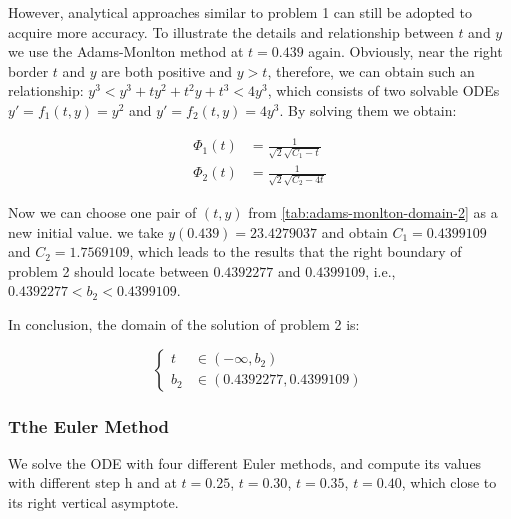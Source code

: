 \documentclass[a4paper]{article}
\begin{document}
	However, analytical approaches similar to problem 1 can still be adopted to acquire more accuracy. To illustrate the details and relationship between $t$ and $y$ we use the Adams-Monlton method at $t = 0.439$ again. Obviously, near the right border $t$ and $y$ are both positive and $y > t$, therefore, we can obtain such an relationship: $y^3 < y^3 + ty^2 +t^2y +t^3 < 4y^3$, which consists of two solvable ODEs $y' = f_1(t, y) = y^2$ and $y' = f_2(t, y) = 4y^3$. By solving them we obtain:
	
	\begin{align}
		\Phi_1(t) &= \frac{1}{\sqrt{2}\sqrt{C_1 - t}} \\
		\Phi_2(t) &= \frac{1}{\sqrt{2}\sqrt{C_2 - 4t}}
	\end{align}
	
	Now we can choose one pair of $(t, y)$ from \autoref{tab:adams-monlton-domain-2} as a new initial value. we take $y(0.439) = 23.4279037$ and obtain $C_1 = 0.4399109$ and $C_2 = 1.7569109$, which leads to the results that the right boundary of problem 2 should locate between $0.4392277$ and $0.4399109$, i.e., $0.4392277 < b_2 < 0.4399109$.
	
	In conclusion, the domain of the solution of problem 2 is:
	
	$$
	\left\{
	\begin{aligned}
		t &\in (-\infty, b_2) \nonumber \\
		b_2 &\in (0.4392277, 0.4399109) \nonumber
	\end{aligned}
	\right.
	$$
	
	
	\subsubsection{Tthe Euler Method}
	
	
	We solve the ODE with four different Euler methods, and compute its values with different step h and at $t = 0.25$, $t = 0.30$, $t = 0.35$, $t = 0.40$, which close to its right vertical asymptote.
	
\end{document}
